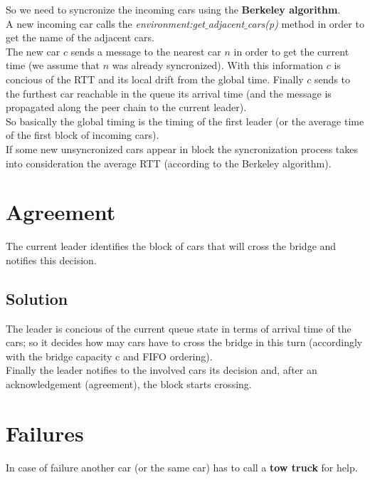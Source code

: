 So we need to syncronize the incoming cars using the \textbf{Berkeley algorithm}.\\

A new incoming car calls the \textit{environment:get$\_$adjacent$\_$cars(p)} 
method in order to get the name of the adjacent cars. \\

The new car $c$ sends a message to the nearest car $n$ in order to get the current time 
(we assume that $n$ was already syncronized). 
With this information $c$ is concious of the RTT and its local drift from the global time. 
Finally $c$ sends to the furthest car 
reachable in the queue its arrival time (and the message is propagated along the 
peer chain to the current leader).\\

So basically the global timing is the timing of the first leader (or the average time 
of the first block of incoming cars).\\

If some new unsyncronized cars appear in block the syncronization process takes into 
consideration the average RTT (according to the Berkeley algorithm). 


\section{Agreement}

The current leader identifies the block of cars that will cross the bridge and notifies
this decision.  

\subsection{Solution}

The leader is concious of the current queue state in terms of arrival time of the cars; 
so it decides how may cars have to cross the bridge in this turn (accordingly with the 
bridge capacity c and FIFO ordering).\\

Finally the leader notifies to the involved cars its decision and, after 
an acknowledgement (agreement), the block starts crossing. 


\section{Failures}

In case of failure another car (or the same car) has to call a \textbf{tow truck} for help.


